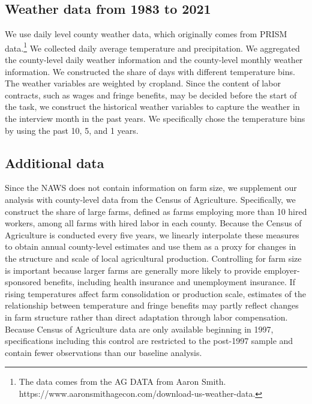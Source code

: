 \documentclass[12pt]{article}
\begin{document}
\subsection{Weather data from 1983 to 2021}
We use daily level county weather data, which originally comes from PRISM data.\footnote{The data comes from the AG DATA from Aaron Smith. https://www.aaronsmithagecon.com/download-us-weather-data.} We collected daily average temperature and precipitation. We aggregated the county-level daily weather information and the county-level monthly weather information. We constructed the share of days with different temperature bins. The weather variables are weighted by cropland. Since the content of labor contracts, such as wages and fringe benefits, may be decided before the start of the task, we construct the historical weather variables to capture the weather in the interview month in the past years. We specifically chose the temperature bins by using the past 10, 5, and 1 years.  

\subsection{Additional data}
Since the NAWS does not contain information on farm size, we supplement our analysis with county-level data from the Census of Agriculture. Specifically, we construct the share of large farms, defined as farms employing more than 10 hired workers, among all farms with hired labor in each county. Because the Census of Agriculture is conducted every five years, we linearly interpolate these measures to obtain annual county-level estimates and use them as a proxy for changes in the structure and scale of local agricultural production. Controlling for farm size is important because larger farms are generally more likely to provide employer-sponsored benefits, including health insurance and unemployment insurance. If rising temperatures affect farm consolidation or production scale, estimates of the relationship between temperature and fringe benefits may partly reflect changes in farm structure rather than direct adaptation through labor compensation. Because Census of Agriculture data are only available beginning in 1997, specifications including this control are restricted to the post-1997 sample and contain fewer observations than our baseline analysis.
\end{document}
